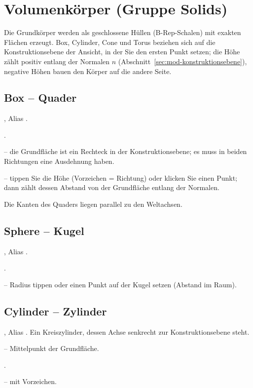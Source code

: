\section{Volumenkörper (Gruppe Solids)}\label{sec:gruppe-solids}

Die Grundkörper werden als geschlossene Hüllen (B-Rep-Schalen) mit exakten Flächen erzeugt.
Box, Cylinder, Cone und Torus beziehen sich auf die Konstruktionsebene der Ansicht, in der Sie
den ersten Punkt setzen; die Höhe zählt positiv entlang der Normalen $n$
(Abschnitt~\ref{sec:mod-konstruktionsebene}), negative Höhen bauen den Körper auf die andere Seite.

\subsection{Box -- Quader}\label{sec:cmd-box}
, Alias .
\begin{schritte}
\item {}.
\item {} -- die Grundfläche ist ein Rechteck in der
  Konstruktionsebene; es muss in beiden Richtungen eine Ausdehnung haben.
\item {} -- tippen Sie die Höhe (Vorzeichen = Richtung) oder
  klicken Sie einen Punkt; dann zählt dessen Abstand von der Grundfläche entlang der Normalen.
\end{schritte}
Die Kanten des Quaders liegen parallel zu den Weltachsen.

\subsection{Sphere -- Kugel}\label{sec:cmd-sphere}
, Alias .
\begin{schritte}
\item {}.
\item {} -- Radius tippen oder einen Punkt auf der Kugel
  setzen (Abstand im Raum).
\end{schritte}

\subsection{Cylinder -- Zylinder}\label{sec:cmd-cylinder}
, Alias . Ein Kreiszylinder, dessen Achse senkrecht zur
Konstruktionsebene steht.
\begin{schritte}
\item {} -- Mittelpunkt der Grundfläche.
\item {}.
\item {} -- mit Vorzeichen.
\end{schritte}

